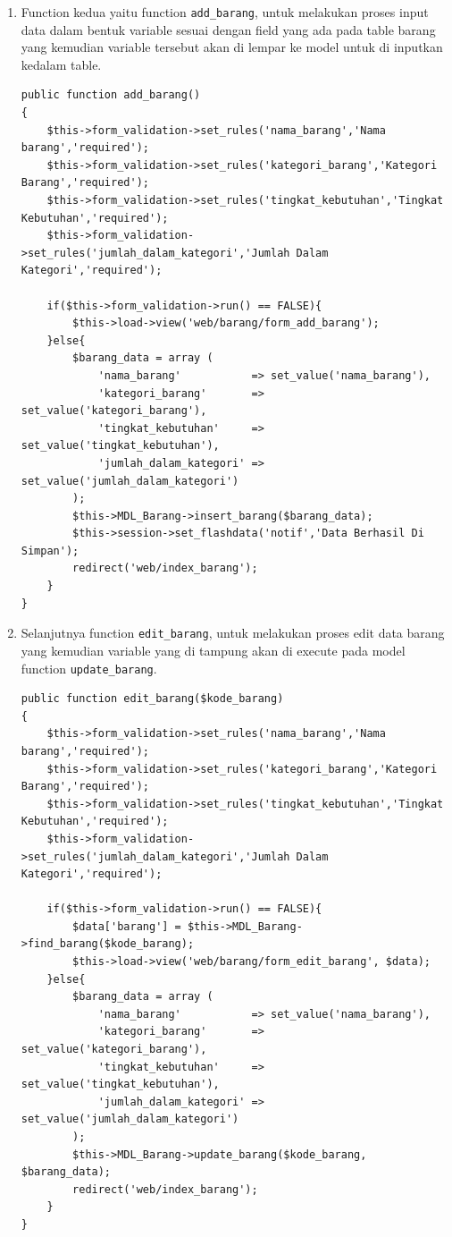 \begin{enumerate}
\begin{enumerate}
        \item Function kedua yaitu function \verb|add_barang|, untuk melakukan proses input data dalam bentuk variable sesuai dengan field yang ada pada table barang  yang kemudian variable tersebut akan di lempar ke model untuk di inputkan kedalam table.
\begin{lstlisting}
public function add_barang()
{
	$this->form_validation->set_rules('nama_barang','Nama barang','required');
	$this->form_validation->set_rules('kategori_barang','Kategori Barang','required');
	$this->form_validation->set_rules('tingkat_kebutuhan','Tingkat Kebutuhan','required');
	$this->form_validation->set_rules('jumlah_dalam_kategori','Jumlah Dalam Kategori','required');
	
	if($this->form_validation->run() == FALSE){
        $this->load->view('web/barang/form_add_barang');
	}else{
		$barang_data = array (
			'nama_barang'			=> set_value('nama_barang'),
			'kategori_barang'		=> set_value('kategori_barang'),
			'tingkat_kebutuhan'		=> set_value('tingkat_kebutuhan'),
			'jumlah_dalam_kategori'	=> set_value('jumlah_dalam_kategori')
		);
		$this->MDL_Barang->insert_barang($barang_data);
		$this->session->set_flashdata('notif','Data Berhasil Di Simpan');
		redirect('web/index_barang');	
	}
}
\end{lstlisting}
    		
    	\item Selanjutnya function \verb|edit_barang|, untuk melakukan proses edit data barang yang kemudian variable yang di tampung akan di execute pada model function \verb|update_barang|.
\begin{lstlisting}
public function edit_barang($kode_barang)
{
	$this->form_validation->set_rules('nama_barang','Nama barang','required');
	$this->form_validation->set_rules('kategori_barang','Kategori Barang','required');
	$this->form_validation->set_rules('tingkat_kebutuhan','Tingkat Kebutuhan','required');
	$this->form_validation->set_rules('jumlah_dalam_kategori','Jumlah Dalam Kategori','required');
	
	if($this->form_validation->run() == FALSE){
		$data['barang'] = $this->MDL_Barang->find_barang($kode_barang);
		$this->load->view('web/barang/form_edit_barang', $data);
	}else{
		$barang_data = array (
			'nama_barang'			=> set_value('nama_barang'),
			'kategori_barang'		=> set_value('kategori_barang'),
			'tingkat_kebutuhan'		=> set_value('tingkat_kebutuhan'),
			'jumlah_dalam_kategori'	=> set_value('jumlah_dalam_kategori')
		);
		$this->MDL_Barang->update_barang($kode_barang, $barang_data);
		redirect('web/index_barang');
	}	
}
\end{lstlisting}
    		

\end{enumerate}
\end{enumerate}
